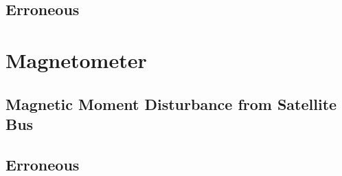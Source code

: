 \cite{dahl+etal_taslp12}

\subsection{Erroneous}

\section{Magnetometer}
\subsection{Magnetic Moment Disturbance from Satellite Bus}

\subsection{Erroneous}

